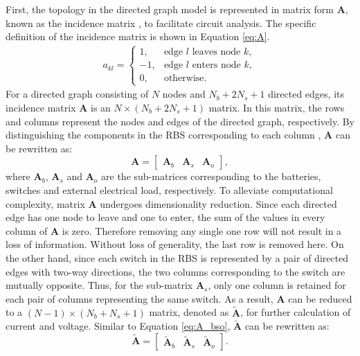 \documentclass{article}
\begin{document}
First, the topology in the directed graph model is represented in matrix form $\bm{A}$, known as the incidence matrix , to facilitate circuit analysis.
The specific definition of the incidence matrix is shown in Equation \ref{eq:A}.
\begin{align}\label{eq:A}
    a_{kl}=
    \begin{cases}
        1,  & \text{edge $l$ leaves node $k$},\\
        -1, & \text{edge $l$ enters node $k$},\\
        0,  & \text{otherwise}.
    \end{cases}
\end{align}
For a directed graph consisting of $N$ nodes and $N_b+2N_s+1$ directed edges, its incidence matrix $\bm{A}$ is an $N\times(N_b+2N_s+1)$ matrix. 
In this matrix, the rows and columns represent the nodes and edges of the directed graph, respectively.
By distinguishing the components in the RBS corresponding to each column , $\bm{A}$ can be rewritten as:
\begin{equation}\label{eq:A_bso}
    \bm{A} =
    \begin{bmatrix}
        \bm{A}_b & \bm{A}_s & \bm{A}_o
    \end{bmatrix},
\end{equation}
where $\bm{A}_b$, $\bm{A}_s$ and $\bm{A}_o$ are the sub-matrices corresponding to the batteries, switches and external electrical load, respectively.
To alleviate computational complexity, matrix $\bm{A}$ undergoes dimensionality reduction.
Since each directed edge has one node to leave and one to enter, the sum of the values in every column of $\bm{A}$ is zero.
Therefore removing any single one row will not result in a loss of information. 
Without loss of generality, the last row is removed here.
On the other hand, since each switch in the RBS is represented by a pair of directed edges with two-way directions, the two columns corresponding to the switch are mutually opposite.
Thus, for the sub-matrix $\bm{A}_s$, only one column is retained for each pair of columns representing the same switch.
As a result, $\bm{A}$ can be reduced to a $(N-1)\times(N_b+N_s+1)$ matrix, denoted as $\bm{\tilde{A}}$, for further calculation of current and voltage.
Similar to Equation \ref{eq:A_bso}, $\bm{\tilde{A}}$ can be rewritten as:
\begin{equation}\label{eq:A_bso_tilde}
    \bm{\tilde{A}} =
    \begin{bmatrix}
        \bm{\tilde{A}}_b & \bm{\tilde{A}}_s & \bm{\tilde{A}}_o
    \end{bmatrix}.
\end{equation}
\end{document}
